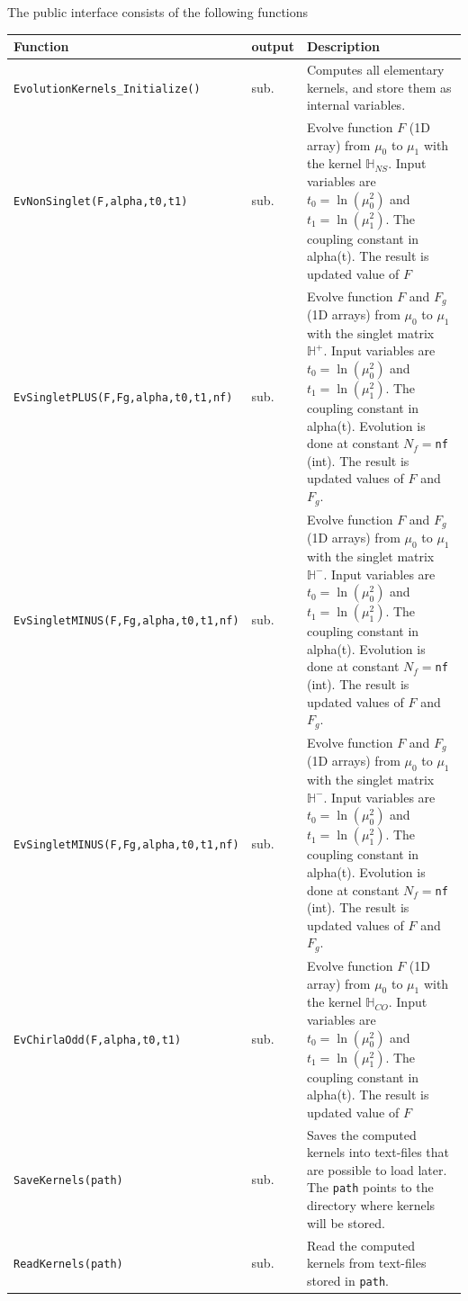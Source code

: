 \documentclass[prd,nofootinbib,eqsecnum,final]{revtex4}
\renewcommand{\(}{\left(}
\renewcommand{\)}{\right)}
\renewcommand{\[}{\left[}
\renewcommand{\]}{\right]}
\begin{document}
The public interface consists of the following functions
\begin{longtable}{||p{6cm}|p{1cm}|p{9cm}||}
Function & output & Description
\\
\hline\hline
\texttt{EvolutionKernels\_Initialize()} & sub. & Computes all elementary kernels, and store them as internal variables.
\\\hline
\texttt{EvNonSinglet(F,alpha,t0,t1)} & sub. & Evolve function $F$ (1D array) from $\mu_0$ to $\mu_1$ with the kernel $\mathbb{H}_{NS}$. Input variables are $t_0=\ln(\mu^2_0)$ and $t_1=\ln(\mu^2_1)$. The coupling constant in alpha(t). The result is updated value of $F$
\\\hline
\texttt{EvSingletPLUS(F,Fg,alpha,t0,t1,nf)} & sub. & Evolve function $F$ and $F_g$ (1D arrays) from $\mu_0$ to $\mu_1$ with the singlet matrix $\mathbb{H}^+$. Input variables are $t_0=\ln(\mu^2_0)$ and $t_1=\ln(\mu^2_1)$. The coupling constant in alpha(t). Evolution is done at constant $N_f=$\texttt{nf} (int). The result is updated values of $F$ and $F_g$.
\\\hline
\texttt{EvSingletMINUS(F,Fg,alpha,t0,t1,nf)} & sub. & Evolve function $F$ and $F_g$ (1D arrays) from $\mu_0$ to $\mu_1$ with the singlet matrix $\mathbb{H}^-$. Input variables are $t_0=\ln(\mu^2_0)$ and $t_1=\ln(\mu^2_1)$. The coupling constant in alpha(t). Evolution is done at constant $N_f=$\texttt{nf} (int). The result is updated values of $F$ and $F_g$.
\\\hline
\texttt{EvSingletMINUS(F,Fg,alpha,t0,t1,nf)} & sub. & Evolve function $F$ and $F_g$ (1D arrays) from $\mu_0$ to $\mu_1$ with the singlet matrix $\mathbb{H}^-$. Input variables are $t_0=\ln(\mu^2_0)$ and $t_1=\ln(\mu^2_1)$. The coupling constant in alpha(t). Evolution is done at constant $N_f=$\texttt{nf} (int). The result is updated values of $F$ and $F_g$.
\\\hline
\texttt{EvChirlaOdd(F,alpha,t0,t1)} & sub. & Evolve function $F$ (1D array) from $\mu_0$ to $\mu_1$ with the kernel $\mathbb{H}_{CO}$. Input variables are $t_0=\ln(\mu^2_0)$ and $t_1=\ln(\mu^2_1)$. The coupling constant in alpha(t). The result is updated value of $F$
\\\hline
\texttt{SaveKernels(path)} & sub. & Saves the computed kernels into text-files that are possible to load later. The \texttt{path} points to the directory where kernels will be stored.
\\\hline
\texttt{ReadKernels(path)} & sub. & Read the computed kernels from text-files stored in \texttt{path}.
\\\hline
\end{longtable}
\end{document}
